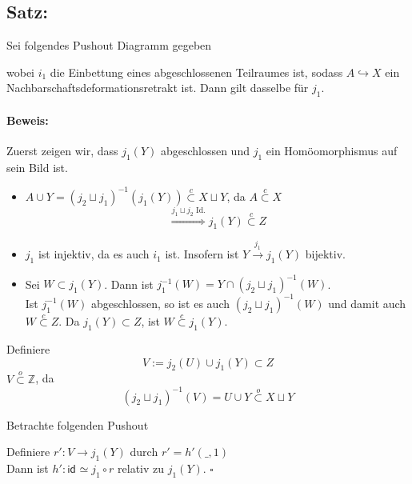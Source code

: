 \documentclass{book}
\newcommand{\Satz}[1]{\subsection{Satz: #1}}
\newenvironment{Beweis}[1]{\paragraph{Beweis: \glqq #1\grqq\\}}{\hfill $\square$}
\renewcommand{\i}{^{-1}}
\newcommand{\id}[1]{\textsf{id}_{#1}}
\newcommand{\Z}{\mathbb{Z}}
\newcommand{\pfeil}[1]{\overset{#1}{\rightarrow}}
\newcommand{\inj}[1]{\overset{#1}{\hookrightarrow}}
\newcommand{\Impl}[1]{\overset{#1}{\Longrightarrow}}
\newcommand{\off}{\overset{o}{\subset}}
\newcommand{\abg}{\overset{c}{\subset}}
\begin{document}
\Satz{}
Sei folgendes Pushout Diagramm gegeben
\begin{center}
\end{center}
wobei $i_1$ die Einbettung eines abgeschlossenen Teilraumes ist, sodass $A\inj{} X$ ein Nachbarschaftsdeformationsretrakt ist. Dann gilt dasselbe für $j_1$.

\begin{Beweis}{}
Zuerst zeigen wir, dass $j_1(Y)$ abgeschlossen und $j_1$ ein Homöomorphismus auf sein Bild ist.
\begin{itemize}
\item $A\cup Y = (j_2\sqcup j_1)\i(j_1(Y)) \abg X \sqcup Y $, da $A \abg X$
\[ \Impl{j_1\sqcup j_2 \text{ Id.}} j_1(Y) \abg Z  \]
\item $j_1$ ist injektiv, da es auch $i_1$ ist. Insofern ist $Y \pfeil{j_1}j_1(Y)$ bijektiv.
\item Sei $W \subset j_1(Y)$. Dann ist $j_1\i(W) = Y \cap (j_2\sqcup j_1)\i(W)$.\\
Ist $j_1\i(W)$ abgeschlossen, so ist es auch $(j_2\sqcup j_1)\i(W)$ und damit auch $W\abg Z$. Da $j_1(Y) \subset Z$, ist $W \abg j_1(Y)$.
\end{itemize}

Definiere
\[V := j_2(U) \cup j_1(Y) \subset Z\]
$V \off \Z$, da
\[ (j_2\sqcup j_1)\i (V) = U \cup Y \off X \sqcup Y\]

Betrachte folgenden Pushout
\begin{center}
\end{center}
Definiere $r' : V \pfeil{}j_1(Y)$ durch $r' = h'(\_, 1)$\\
Dann ist $h' : \id{} \simeq j_1\circ r$ relativ zu $j_1(Y)$.
\end{Beweis}
\end{document}
